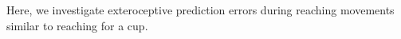 
Here, we investigate exteroceptive prediction errors during reaching movements similar to reaching for a cup. 
